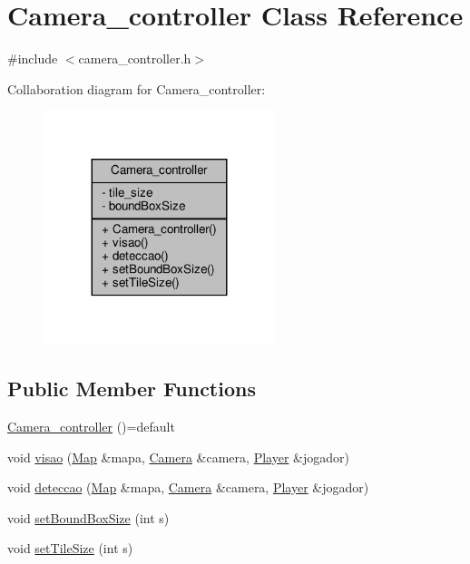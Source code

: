 \hypertarget{classCamera__controller}{}\section{Camera\+\_\+controller Class Reference}
\label{classCamera__controller}


{\ttfamily \#include $<$camera\+\_\+controller.\+h$>$}



Collaboration diagram for Camera\+\_\+controller\+:
\nopagebreak
\begin{figure}[H]
\begin{center}
\leavevmode
\includegraphics[width=191pt]{classCamera__controller__coll__graph}
\end{center}
\end{figure}
\subsection*{Public Member Functions}
\begin{DoxyCompactItemize}
\item 
\hyperlink{classCamera__controller_aa086aceef7d7548429d2023f333e3b19}{Camera\+\_\+controller} ()=default
\item 
void \hyperlink{classCamera__controller_a0d2df9cb25e3a63cd76fe8e0b2a9686d}{visao} (\hyperlink{classMap}{Map} \&mapa, \hyperlink{classCamera}{Camera} \&camera, \hyperlink{classPlayer}{Player} \&jogador)
\item 
void \hyperlink{classCamera__controller_a039d613f59cd15c4ea2a0493ca47701b}{deteccao} (\hyperlink{classMap}{Map} \&mapa, \hyperlink{classCamera}{Camera} \&camera, \hyperlink{classPlayer}{Player} \&jogador)
\item 
void \hyperlink{classCamera__controller_a15d8ce3924d5a274db49cccc2794536d}{set\+Bound\+Box\+Size} (int s)
\item 
void \hyperlink{classCamera__controller_a1e5255b02b3bc54d7b4ac92830f8f41c}{set\+Tile\+Size} (int s)
\end{DoxyCompactItemize}
